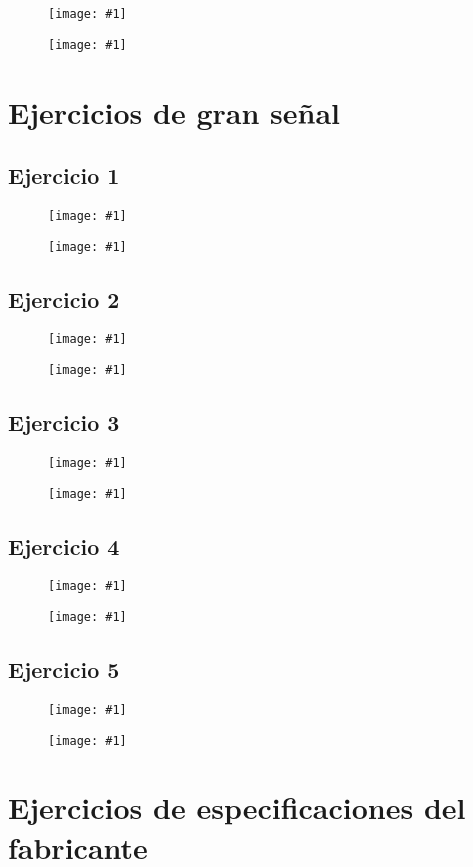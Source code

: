 \documentclass{mylib/reporteCorto}
\newcommand{\insertImage}[2]{
	\begin{figure}[H]
		\centering
		\texttt{[image: \#1]}
	\end{figure}
}
\begin{document}
\insertImage{img/dispos_serie2/seg_peque3}{15}

\insertImage{img/dispos_serie2/sol_seg_peque3}{10}



\section{Ejercicios de gran señal}

\subsection{Ejercicio 1}

\insertImage{img/dispos_serie2/seg_grande1}{15}

\insertImage{img/dispos_serie2/sol_seg_grande1}{10}

\subsection{Ejercicio 2}

\insertImage{img/dispos_serie2/seg_grande2}{15}

\insertImage{img/dispos_serie2/sol_seg_grande2}{10}


\subsection{Ejercicio 3}

\insertImage{img/dispos_serie2/seg_grande3}{15}

\insertImage{img/dispos_serie2/sol_seg_grande3}{10}


\subsection{Ejercicio 4}

\insertImage{img/dispos_serie2/seg_grande4}{15}

\insertImage{img/dispos_serie2/sol_seg_grande4}{10}


\subsection{Ejercicio 5}

\insertImage{img/dispos_serie2/seg_grande5}{15}

\insertImage{img/dispos_serie2/sol_seg_grande5}{10}



\section{Ejercicios de especificaciones del fabricante}
\end{document}
